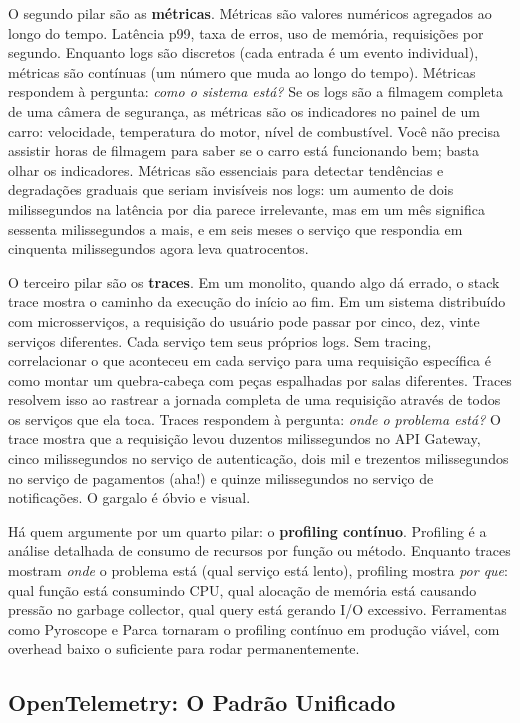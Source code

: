 O segundo pilar são as \textbf{métricas}. Métricas são valores numéricos agregados
ao longo do tempo. Latência p99, taxa de erros, uso de memória, requisições por
segundo. Enquanto logs são discretos (cada entrada é um evento individual),
métricas são contínuas (um número que muda ao longo do tempo). Métricas respondem
à pergunta: \emph{como o sistema está?} Se os logs são a filmagem completa de
uma câmera de segurança, as métricas são os indicadores no painel de um carro:
velocidade, temperatura do motor, nível de combustível. Você não precisa assistir
horas de filmagem para saber se o carro está funcionando bem; basta olhar os
indicadores. Métricas são essenciais para detectar tendências e degradações
graduais que seriam invisíveis nos logs: um aumento de dois milissegundos na
latência por dia parece irrelevante, mas em um mês significa sessenta milissegundos
a mais, e em seis meses o serviço que respondia em cinquenta milissegundos agora
leva quatrocentos.

O terceiro pilar são os \textbf{traces}. Em um monolito, quando algo dá errado,
o stack trace mostra o caminho da execução do início ao fim. Em um sistema
distribuído com microsserviços, a requisição do usuário pode passar por cinco,
dez, vinte serviços diferentes. Cada serviço tem seus próprios logs. Sem tracing,
correlacionar o que aconteceu em cada serviço para uma requisição específica é
como montar um quebra-cabeça com peças espalhadas por salas diferentes. Traces
resolvem isso ao rastrear a jornada completa de uma requisição através de todos
os serviços que ela toca. Traces respondem à pergunta: \emph{onde o problema está?}
O trace mostra que a requisição levou duzentos milissegundos no API Gateway,
cinco milissegundos no serviço de autenticação, dois mil e trezentos milissegundos
no serviço de pagamentos (aha!) e quinze milissegundos no serviço de notificações.
O gargalo é óbvio e visual.

Há quem argumente por um quarto pilar: o \textbf{profiling contínuo}. Profiling
é a análise detalhada de consumo de recursos por função ou método. Enquanto traces
mostram \emph{onde} o problema está (qual serviço está lento), profiling mostra
\emph{por que}: qual função está consumindo CPU, qual alocação de memória está
causando pressão no garbage collector, qual query está gerando I/O excessivo.
Ferramentas como Pyroscope e Parca tornaram o profiling contínuo em produção
viável, com overhead baixo o suficiente para rodar permanentemente.

\subsection{OpenTelemetry: O Padrão Unificado}

